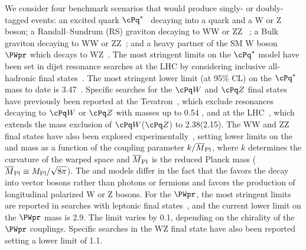 We consider four benchmark scenarios that would produce singly- or
doubly-tagged events: an excited quark $\cPq^*$~\cite{ref_qstar}
decaying into a quark and a W or Z boson; a Randall--Sundrum (RS)
graviton \GRS decaying to WW or ZZ ~\cite{rs1}; a Bulk graviton \GBulk
decaying to WW or ZZ~\cite{GravitonWWZZ1,GravitonWWZZ2,GravitonWWZZ3};
and a heavy partner of the SM W boson $\PWpr$ which decays to
WZ~\cite{ref_gauge}.  The most stringent limits on the $\cPq^*$ model
have been set in dijet resonance searches at the LHC by considering
inclusive all-hadronic final
states~\cite{exo12016,ATLASexcitedPAS,Harris:2011bh}.
The most stringent lower limit (at
95\% CL) on the $\cPq^*$ mass to date is 3.47\TeVcc~\cite{exo12016}.
Specific searches for the $\cPq\PW$ and $\cPq\cPZ$ final states have
previously been reported at the
Tevatron~\cite{CDFexcitedPAPER,D0excitedPAPER}, which exclude
resonances decaying to $\cPq\PW$ or $\cPq\cPZ$ with masses up to 0.54
\TeVcc, and at the LHC~\cite{ref_2011,CMSqZPAS}, which extends the
mass exclusion of $\cPq\PW$($\cPq\cPZ$) to 2.38\TeVcc(2.15\TeVcc).
The WW and ZZ final states have also been explored
experimentally~\cite{CMSZZPAS2,ATLASWWPAPER,ATLASZZPAPER,CDFZZPAPER},
setting lower limits on the \GRS and \GBulk mass as a function of the
coupling parameter $k/\overline{M}_\text{Pl}$, where $k$ determines the curvature of the
warped space and $\overline{M}_\text{Pl}$ is the reduced Planck mass ($\overline{M}_\text{Pl} \equiv
M_\text{Pl}/\sqrt{8\pi}$).  The \GBulk and \GRS models differ in the
fact that the \GBulk favors the decay into vector bosons rather than
photons or fermions and favors the production of longitudinal
polarized W or Z bosons.  For the $\PWpr$, the most stringent limits
are reported in searches with leptonic final
states~\cite{CMSwprimePAPER2013,ATLASwprimePAPER}, and the current
lower limit on the $\PWpr$ mass is 2.9\TeVcc.  The limit varies by
0.1\TeVcc, depending on the chirality of the $\PWpr$ couplings.
Specific searches in the WZ final state have also been
reported~\cite{CMSwprimeWZPAS,ATLASWWPAPER,ATLASwprimeWZPAS} setting a
lower limit of 1.1\TeVcc .


